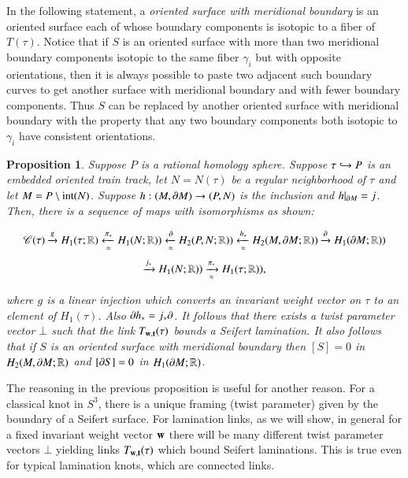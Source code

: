 \documentclass[12pt]{article}
\newtheorem{proposition}[thm]{Proposition}
\theoremstyle{remark}
\begin{document}
In the following statement, a {\it oriented surface with meridional boundary} is an oriented surface each of whose boundary components is isotopic to a fiber of $T(\tau)$.  Notice that if $S$ is an oriented surface with more than two meridional boundary  components isotopic to the same fiber $\gamma_i$ but with opposite orientations, then it is always possible to paste two adjacent such boundary curves to get another surface with meridional boundary and with fewer boundary components.    Thus $S$ can be replaced by another oriented surface with meridional boundary with the property that any two boundary components both isotopic to $\gamma_i$ have consistent orientations.

\begin{proposition}\label{HomologySeifert}  Suppose $P$ is a rational homology sphere.  Suppose $\tau \hookrightarrow P$ is an embedded oriented train track, let $N=N(\tau)$ be a regular neighborhood of $\tau$ and let $M=P\setminus {\rm int}(N)$.  Suppose $h:(M,\partial M)\to (P,N)$ is the inclusion and $h|_{\partial M}=j$.  Then, there is a sequence of maps with isomorphisms as shown:

$$\mathscr{C}(\tau)\xrightarrow{g} H_1(\tau;\mathbb R)\xleftarrow[\approx]{\pi_*} H_1(N;\mathbb R))\xleftarrow[\approx]{\partial}H_2(P,N;\mathbb R))\xleftarrow[\approx]{h_*} H_2(M,\partial M;\mathbb R))\xrightarrow{\partial}H_1(\partial M;\mathbb R))$$ $$\xrightarrow{j_*}H_1(N;\mathbb R))\xrightarrow [\approx]{\pi_*}  H_1(\tau;\mathbb R)) ,$$


\noindent where $g$ is a linear injection which converts an invariant weight vector on $\tau$ to an element of $H_1(\tau)$.   Also $\partial h_*=j_*\partial$.   It follows that there exists a twist parameter vector $\bot$ such that the link  $T_{{\bf w},{\bf t}}(\tau)$ bounds a Seifert lamination.   It also follows that if $S$ is an oriented surface with meridional boundary then $[S]=0$ in $H_2(M,\partial M;\mathbb R)$ and $[\partial S]=0$ in $H_1(\partial M;\mathbb R)$.
\end{proposition}



 The reasoning in the previous proposition is useful for another reason.  For a classical knot in $S^3$, there is a unique framing (twist parameter) given by the boundary of a Seifert surface.   For lamination links, as we will show, in general for a fixed invariant weight vector ${\bf w}$ there will be many different twist parameter vectors $\bot$ yielding links $T_{{\bf w},{\bf t}}(\tau)$ which bound Seifert laminations.   This is true even for typical lamination knots, which are connected links.  
 
\end{document}
